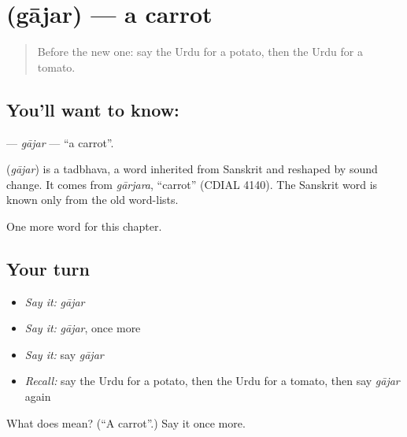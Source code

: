 \section[\texorpdfstring{\ur{گاجر} (gājar)}{گاجر (gājar)}]{ (gājar) — a carrot}

\label{lesson:UR-C55-gajar}



\begin{quote}
Before the new one: say the Urdu for a potato, then the Urdu for a tomato.
\end{quote}

\subsection*{You'll want to know: }
\textbf{} — \emph{gājar} — \textquotedblleft{}a carrot\textquotedblright{}.

\begin{cousinweb}
\textbf{} (\emph{gājar}) is a tadbhava, a word inherited from Sanskrit and reshaped by sound change. It comes from \emph{gārjara}, \textquotedblleft{}carrot\textquotedblright{} (CDIAL 4140). The Sanskrit word is known only from the old word-lists.
\end{cousinweb}

\begin{grammarlens}[title={What you've built}]
One more word for this chapter.
\end{grammarlens}

\subsection*{Your turn}
\begin{itemize}
\raggedright
  \item \emph{Say it:} \emph{gājar}
  \item \emph{Say it:} \emph{gājar}, once more
  \item \emph{Say it:} say \emph{gājar}
  \item \emph{Recall:} say the Urdu for a potato, then the Urdu for a tomato, then say \emph{gājar} again
\end{itemize}

\begin{tcolorbox}[breakable,colback=teal!4,colframe=teal!35!black,title={Before you move on}]
What does  mean? (\textquotedblleft{}A carrot\textquotedblright{}.) Say it once more.
\end{tcolorbox}

